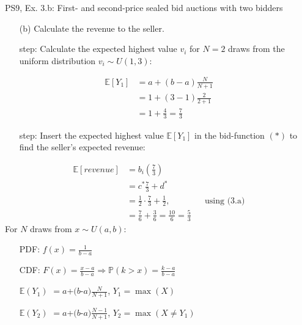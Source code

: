 \begin{frame}{PS9, Ex. 3.b: First- and second-price sealed bid auctions with two bidders}
    \begin{multicols}{2}
      \begin{itemize}
        \item[(b)] Calculate the revenue to the seller.
        \item[\nth{1} step:] Calculate the expected highest value $v_i$ for $N=2$ draws from the uniform distribution $v_i\sim U(1,3)$:
      \end{itemize}
      \vspace{-8pt}
      \begin{align*}
        \mathbb{E}[Y_1]&=a+(b-a)\frac{N}{N+1}\\
                       &=1+(3-1)\frac{2}{2+1}\\
                       &=1+\frac{4}{3}=\frac{7}{3}
      \end{align*}
      \vspace{-12pt}
      \begin{itemize}
        \item[\nth{2} step:] Insert the expected highest value $\mathbb{E}[Y_1]$ in the bid-function $(*)$  to find the seller's expected revenue:
      \end{itemize}
      \vspace{-8pt}
      \begin{align*}
        \mathbb{E}[revenue]&=b_i\left(\frac{7}{3}\right)\\
                           &= c^*\frac{7}{3}+d^*\\
                           &= \frac{1}{2}\cdot\frac{7}{3}+\frac{1}{2},&&\text{using (3.a)}\\
                           &= \frac{7}{6}+\frac{3}{6}=\frac{10}{6}=\frac{5}{3}
      \end{align*}
      \vfill\null\columnbreak
      For $N$ draws from $x\sim U(a, b):$
      \vspace{-6pt}
      \begin{enumerate}
        \item[PDF:] $f(x)=\frac{1}{b-a}$
        \item[CDF:] $F(x)=\frac{x-a}{b-a}\Rightarrow\mathbb{P}(k>x)=\frac{k-a}{b-a}$
        \item[$\mathbb{E}(Y_1)$] $=a$+$(b$-$a)\frac{N}{N+1}$, $Y_1=\max(X)$
        \item[$\mathbb{E}(Y_2)$] $=a$+$(b$-$a)\frac{N-1}{N+1}$, $Y_2=\max(X\neq Y_1)$
      \end{enumerate}

\end{multicols}
\end{frame}
